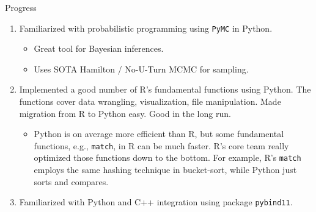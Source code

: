 \documentclass[aspectratio=169]{beamer}
\begin{document}
\begin{frame}{Progress}
\begin{enumerate}
\item Familiarized with probabilistic programming using \texttt{PyMC} in Python.\medskip

\begin{itemize}
\item Great tool for Bayesian inferences.\medskip

\item Uses SOTA Hamilton / No-U-Turn MCMC for sampling.\medskip
\end{itemize}

\item Implemented a good number of R's fundamental functions using Python. The functions cover data wrangling, visualization, file manipulation. Made migration from R to Python easy. Good in the long run.\medskip

\begin{itemize}
\item Python is on average more efficient than R, but some fundamental functions, e.g., \texttt{match}, in R can be much faster. R's core team really optimized those functions down to the bottom. For example, R's \texttt{match} employs the same hashing technique in bucket-sort, while Python just sorts and compares.\medskip
\end{itemize}

\item Familiarized with Python and C++ integration using package \texttt{pybind11}.
\end{enumerate}
\end{frame}
\end{document}
